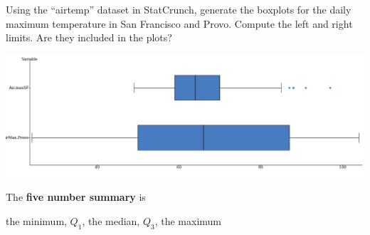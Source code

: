 \documentclass[../mathNotesPreamble]{subfiles}
\begin{document}
  \begin{ex*}
    Using the ``airtemp'' dataset in StatCrunch, generate the boxplots for the daily maximum temperature in San Francisco and Provo. Compute the left and right limits. Are they included in the plots?
  \end{ex*}

  \begin{center}
    \includegraphics[width=0.925\linewidth]{images/math211_sf_provo_temp_boxplots}
  \end{center}

  \begin{defn*}
    The \textbf{five number summary} is
    \begin{center}
       the minimum, $Q_1$, the median, $Q_3$, the maximum
    \end{center}
  \end{defn*}

  \pagebreak
\end{document}
